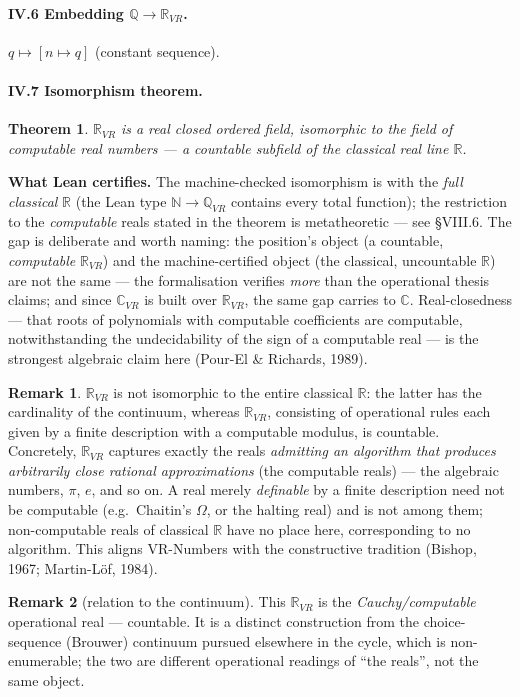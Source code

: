 \documentclass[11pt]{article}
\newtheorem{theorem}{Theorem}
\theoremstyle{definition}
\newtheorem{remark}{Remark}
\newcommand{\Q}{\mathbb{Q}}
\newcommand{\R}{\mathbb{R}}
\newcommand{\C}{\mathbb{C}}
\newcommand{\N}{\mathbb{N}}
\begin{document}
\paragraph{IV.6 Embedding $\Q\to\R_{VR}$.} $q\mapsto[n\mapsto q]$ (constant sequence).

\paragraph{IV.7 Isomorphism theorem.}
\begin{theorem}
$\R_{VR}$ is a real closed ordered field, isomorphic to the field of computable real numbers ---
a countable subfield of the classical real line $\R$.
\end{theorem}
\noindent\textbf{What Lean certifies.} The machine-checked isomorphism is with the \emph{full
classical} $\R$ (the Lean type $\N\to\Q_{VR}$ contains every total function); the restriction to the
\emph{computable} reals stated in the theorem is metatheoretic --- see \S VIII.6. The gap is
deliberate and worth naming: the position's object (a countable, \emph{computable} $\R_{VR}$) and the
machine-certified object (the classical, uncountable $\R$) are not the same --- the formalisation
verifies \emph{more} than the operational thesis claims; and since $\C_{VR}$ is built over $\R_{VR}$, the
same gap carries to $\C$. Real-closedness ---
that roots of polynomials with computable coefficients are computable, notwithstanding the
undecidability of the sign of a computable real --- is the strongest algebraic claim here
(Pour-El \& Richards, 1989).
\begin{remark}
$\R_{VR}$ is not isomorphic to the entire classical $\R$: the latter has the cardinality of the
continuum, whereas $\R_{VR}$, consisting of operational rules each given by a finite description with
a computable modulus, is countable. Concretely, $\R_{VR}$ captures exactly the reals \emph{admitting
an algorithm that produces arbitrarily close rational approximations} (the computable reals) --- the
algebraic numbers, $\pi$, $e$, and so on. A real merely \emph{definable} by a finite description need
not be computable (e.g.\ Chaitin's $\Omega$, or the halting real) and is not among them; non-computable
reals of classical $\R$ have no place here, corresponding to no algorithm. This aligns VR-Numbers
with the constructive tradition (Bishop, 1967; Martin-L\"of, 1984).
\end{remark}
\begin{remark}[relation to the continuum]
This $\R_{VR}$ is the \emph{Cauchy/computable} operational real --- countable. It is a distinct
construction from the choice-sequence (Brouwer) continuum pursued elsewhere in the cycle, which is
non-enumerable; the two are different operational readings of ``the reals'', not the same object.
\end{remark}
\end{document}
